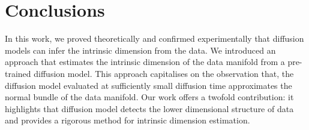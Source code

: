     \begin{table}[ht]
    \centering
    \vspace{8pt} %
    \caption{Comparison of dimensionality detection methods on various data manifolds.}
    \label{ch3:tbl:results}
    \end{table}
    

\section{Conclusions}
\label{ch3:sec:conclusions}
In this work, we proved theoretically and confirmed experimentally that diffusion models can infer the intrinsic dimension from the data. We introduced an approach that estimates the intrinsic dimension of the data manifold from a pre-trained diffusion model. This approach capitalises on the observation that, the diffusion model evaluated at sufficiently small diffusion time approximates the normal bundle of the data manifold.  Our work offers a twofold contribution: it highlights that diffusion model detects the lower dimensional structure of data and provides a rigorous method for intrinsic dimension estimation. 

